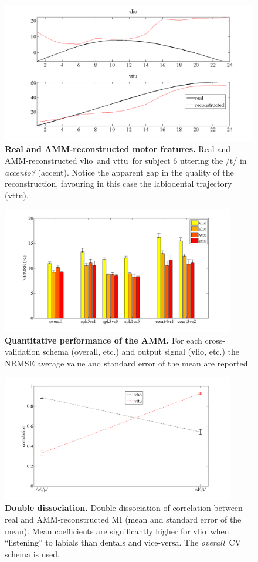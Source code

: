 \documentclass[10pt]{article}
\newcommand{\vlio}{\textsf{vlio}}
\newcommand{\vttu}{\textsf{vttu}}
\newcommand{\overall}{\emph{overall}}
\begin{document}
\begin{figure}[t]
\centerline{\includegraphics[width=\textwidth]{figs/recMIs}}
\caption{{\bf Real and AMM-reconstructed motor features.} Real and AMM-reconstructed \vlio\ and \vttu\ for subject $6$ uttering
the /t/ in \emph{accento?} (accent). Notice the apparent gap in the quality
of the reconstruction, favouring in this case the labiodental trajectory (\vttu).}
\label{fig:example}
\end{figure}

\begin{figure}[ht]
\begin{center}
\includegraphics[width=4in]{figs/AMM}
\end{center} 
\caption{{\bf Quantitative performance of the AMM.} For each cross-validation schema (overall, etc.)
and output signal (\vlio, etc.) the NRMSE average value and standard error of the mean
are reported.} \label{fig:amm_perf}
\end{figure}

\begin{figure}[t]
\centerline{\includegraphics[width=4in]{figs/doubleDiss}}
\caption{{\bf Double dissociation.} Double dissociation of correlation between real and AMM-reconstructed MI
(mean and standard error of the mean). Mean coefficients are significantly
higher for \vlio\ when ``listening'' to labials than dentals and vice-versa.
The \overall\ CV schema is used.}
\label{fig:DD}
\end{figure}
\end{document}
